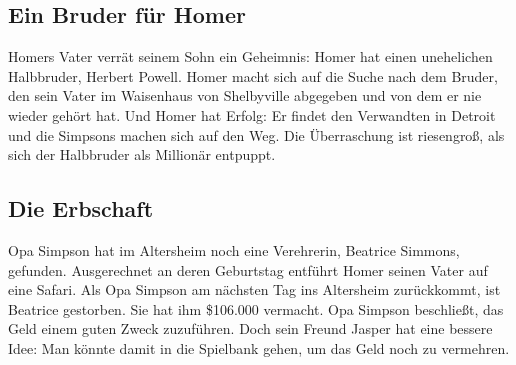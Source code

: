 	
\subsection{Ein Bruder für Homer}\label{7F16}
Homers Vater verrät seinem Sohn ein Geheimnis: Homer hat einen unehelichen Halbbruder, Herbert Powell. Homer macht sich auf die Suche nach dem Bruder, den sein Vater im Waisenhaus von Shelbyville abgegeben und von dem er nie wieder gehört hat. Und Homer hat Erfolg: Er findet den Verwandten in Detroit und die Simpsons machen sich auf den Weg. Die Überraschung ist riesengroß, als sich der Halbbruder als Millionär entpuppt.


\subsection{Die Erbschaft}\label{7F17}
Opa Simpson hat im Altersheim noch eine Verehrerin, Beatrice Simmons, gefunden. Ausgerechnet an deren Geburtstag entführt Homer seinen Vater auf eine Safari. Als Opa Simpson am nächsten Tag ins Altersheim zurückkommt, ist Beatrice gestorben. Sie hat ihm \$106.000 vermacht. Opa Simpson beschließt, das Geld einem guten Zweck zuzuführen. Doch sein Freund Jasper hat eine bessere Idee: Man könnte damit in die Spielbank gehen, um das Geld noch zu vermehren.

